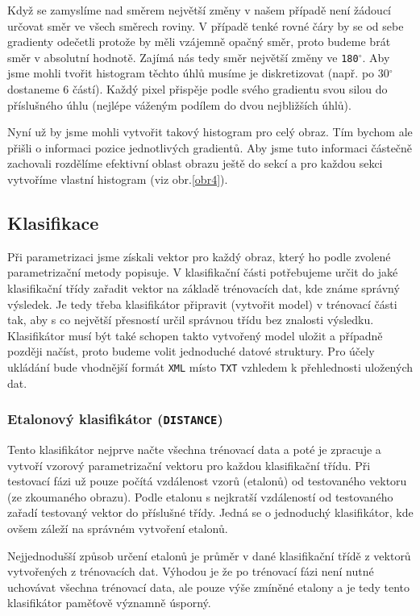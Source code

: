 \documentclass[12pt]{article}
\begin{document}
Když se zamyslíme nad směrem největší změny v našem případě není žádoucí určovat směr ve všech směrech roviny. V případě tenké rovné čáry by se od sebe gradienty odečetli protože by měli vzájemně opačný směr, proto budeme brát směr v absolutní hodnotě. Zajímá nás tedy směr největší změny ve \texttt{180$^{\circ}$}. Aby jsme mohli tvořit histogram těchto úhlů musíme je diskretizovat (např. po 30$^{\circ}$ dostaneme 6 částí). Každý pixel přispěje podle svého gradientu svou silou do příslušného úhlu (nejlépe váženým podílem do dvou nejbližších úhlů). 

Nyní už by jsme mohli vytvořit takový histogram pro celý obraz. Tím bychom ale přišli o informaci pozice jednotlivých gradientů. Aby jsme tuto informaci částečně zachovali rozdělíme efektivní oblast obrazu ještě do sekcí a pro každou sekci vytvoříme vlastní histogram (viz obr.\ref{obr4}).

\subsection{Klasifikace}
Při parametrizaci jsme získali vektor pro každý obraz, který ho podle zvolené parametrizační metody popisuje. V klasifikační části potřebujeme určit do jaké klasifikační třídy zařadit vektor na základě trénovacích dat, kde známe správný výsledek. Je tedy třeba klasifikátor připravit (vytvořit model) v trénovací části tak, aby s co největší přesností určil správnou třídu bez znalosti výsledku. Klasifikátor musí být také schopen takto vytvořený model uložit a případně později načíst, proto budeme volit jednoduché datové struktury. Pro účely ukládání bude vhodnější formát \texttt{XML} místo \texttt{TXT} vzhledem k přehlednosti uložených dat.

\subsubsection{Etalonový klasifikátor (\texttt{DISTANCE})}
Tento klasifikátor nejprve načte všechna trénovací data a poté je zpracuje a vytvoří vzorový parametrizační vektoru pro každou klasifikační třídu. Při testovací fázi už pouze počítá vzdálenost vzorů (etalonů) od testovaného vektoru (ze zkoumaného obrazu). Podle etalonu s nejkratší vzdáleností od testovaného zařadí testovaný vektor do příslušné třídy. Jedná se o jednoduchý klasifikátor, kde ovšem záleží na správném vytvoření etalonů.

Nejjednodušší způsob určení etalonů je průměr v dané klasifikační třídě z vektorů vytvořených z trénovacích dat. Výhodou je že po trénovací fázi není nutné uchovávat všechna trénovací data, ale pouze výše zmíněné etalony a je tedy tento klasifikátor paměťově významně úsporný.
\end{document}
